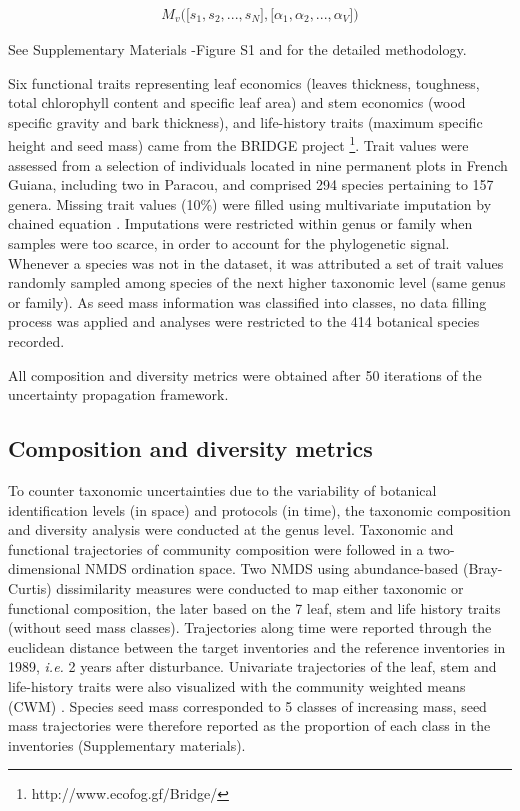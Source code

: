 \documentclass[fleqn,10pt]{ArtEcoFoG} %
\begin{document}
\begin{align}
M_v\Big(\big[s_1, s_2,..., s_N\big],\big[\alpha_1, \alpha_2,..., \alpha_V\big]\Big) \nonumber
\end{align}

See Supplementary Materials -Figure S1 and \citet{Aubry-Kientz2013} for
the detailed methodology.

Six functional traits representing leaf economics (leaves thickness,
toughness, total chlorophyll content and specific leaf area) and stem
economics (wood specific gravity and bark thickness), and life-history
traits (maximum specific height and seed mass) came from the BRIDGE
project \footnote{http://www.ecofog.gf/Bridge/}. Trait values were
assessed from a selection of individuals located in nine permanent plots
in French Guiana, including two in Paracou, and comprised 294 species
pertaining to 157 genera. Missing trait values (10\%) were filled using
multivariate imputation by chained equation \citep{Mice2011}.
Imputations were restricted within genus or family when samples were too
scarce, in order to account for the phylogenetic signal. Whenever a
species was not in the dataset, it was attributed a set of trait values
randomly sampled among species of the next higher taxonomic level (same
genus or family). As seed mass information was classified into classes,
no data filling process was applied and analyses were restricted to the
414 botanical species recorded.

All composition and diversity metrics were obtained after 50 iterations
of the uncertainty propagation framework.

\subsection{Composition and diversity
metrics}\label{composition-and-diversity-metrics}

To counter taxonomic uncertainties due to the variability of botanical
identification levels (in space) and protocols (in time), the taxonomic
composition and diversity analysis were conducted at the genus level.
Taxonomic and functional trajectories of community composition were
followed in a two-dimensional NMDS ordination space. Two NMDS using
abundance-based (Bray-Curtis) dissimilarity measures were conducted to
map either taxonomic or functional composition, the later based on the 7
leaf, stem and life history traits (without seed mass classes).
Trajectories along time were reported through the euclidean distance
between the target inventories and the reference inventories in 1989,
\emph{i.e.} 2 years after disturbance. Univariate trajectories of the
leaf, stem and life-history traits were also visualized with the
community weighted means (CWM) \citep{Diaz2007}. Species seed mass
corresponded to 5 classes of increasing mass, seed mass trajectories
were therefore reported as the proportion of each class in the
inventories (Supplementary materials).
\end{document}
